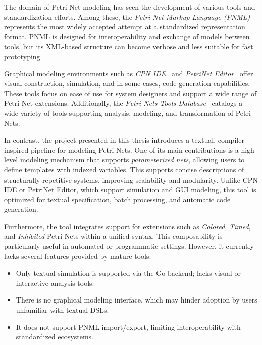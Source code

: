 \documentclass[12pt]{article}
\begin{document}
            The domain of Petri Net modeling has seen the development of various tools and standardization efforts. Among these, the \emph{Petri Net Markup Language (PNML)}~\cite{weber2003petri} represents the most widely accepted attempt at a standardized representation format. PNML is designed for interoperability and exchange of models between tools, but its XML-based structure can become verbose and less suitable for fast prototyping.
            
            Graphical modeling environments such as \emph{CPN IDE}~\cite{verbeek2021cpn} and \emph{PetriNet Editor}~\cite{app10217662} offer visual construction, simulation, and in some cases, code generation capabilities. These tools focus on ease of use for system designers and support a wide range of Petri Net extensions. Additionally, the \emph{Petri Nets Tools Database}~\cite{tgi_petri_tools} catalogs a wide variety of tools supporting analysis, modeling, and transformation of Petri Nets.
            
            In contrast, the project presented in this thesis introduces a textual, compiler-inspired pipeline for modeling Petri Nets. One of its main contributions is a high-level modeling mechanism that supports \emph{parameterized nets}, allowing users to define templates with indexed variables. This supports concise descriptions of structurally repetitive systems, improving scalability and modularity. Unlike CPN IDE or PetriNet Editor, which support simulation and GUI modeling, this tool is optimized for textual specification, batch processing, and automatic code generation.
            
            Furthermore, the tool integrates support for extensions such as \emph{Colored}, \emph{Timed}, and \emph{Inhibited} Petri Nets within a unified syntax. This composability is particularly useful in automated or programmatic settings. However, it currently lacks several features provided by mature tools:
            \begin{itemize}
                \item Only textual simulation is supported via the Go backend; lacks visual or interactive analysis tools.
                \item There is no graphical modeling interface, which may hinder adoption by users unfamiliar with textual DSLs.
                \item It does not support PNML import/export, limiting interoperability with standardized ecosystems.
            \end{itemize}
            
\end{document}

